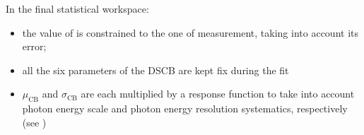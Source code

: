 In the final statistical workspace:
\begin{itemize}
	\item the value of \mH is constrained to the one of \RunOne measurement, taking into account its error;
	\item all the six parameters of the DSCB are kept fix during the fit
	\item $\mu_\text{CB}$ and $\sigma_\text{CB}$ are each multiplied by a response function to take into account photon energy scale and photon energy resolution systematics, respectively (see \Sect{\ref{sssec:signal_shape_syst}} )
\end{itemize}

